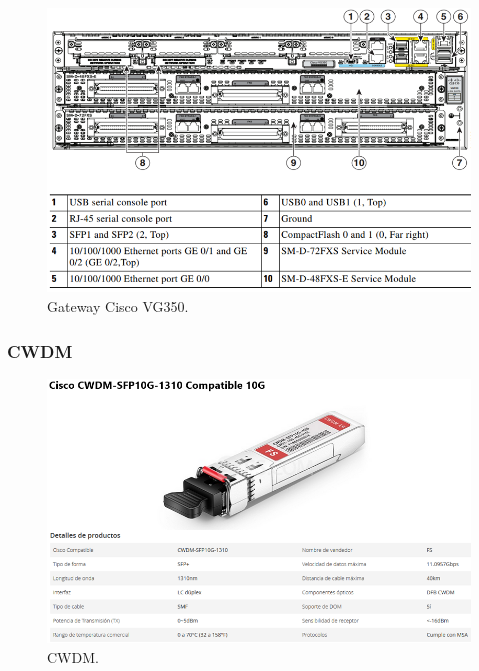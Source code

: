 \documentclass[12pt,letterpaper]{article}
\begin{document}

\begin{figure}[ht]
    \centering
    \includegraphics[width=.8\textwidth]{imagenes/gatequipo.PNG}
    \caption{Gateway Cisco VG350.}
\end{figure}

\subsubsection{CWDM}
\begin{figure}[ht]
    \centering
    \includegraphics[width=1\textwidth]{imagenes/cwdm.PNG}
    \caption{CWDM.}
\end{figure}
\end{document}
